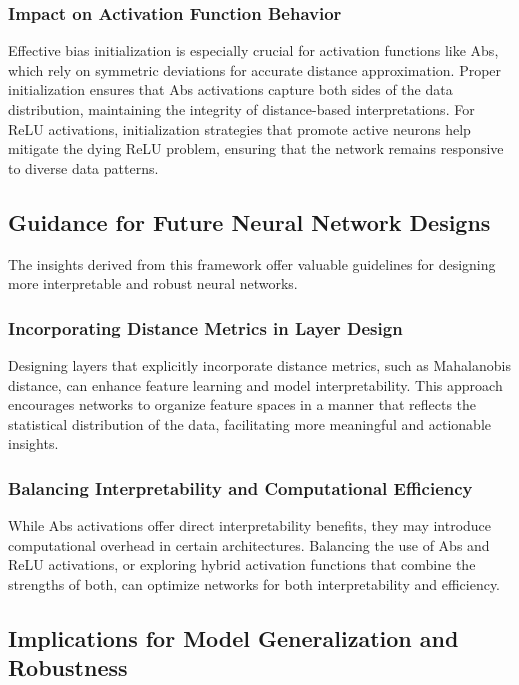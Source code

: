 \subsubsection{Impact on Activation Function Behavior}

Effective bias initialization is especially crucial for activation functions like Abs, which rely on symmetric deviations for accurate distance approximation. Proper initialization ensures that Abs activations capture both sides of the data distribution, maintaining the integrity of distance-based interpretations. For ReLU activations, initialization strategies that promote active neurons help mitigate the dying ReLU problem, ensuring that the network remains responsive to diverse data patterns.

\subsection{Guidance for Future Neural Network Designs}

The insights derived from this framework offer valuable guidelines for designing more interpretable and robust neural networks.

\subsubsection{Incorporating Distance Metrics in Layer Design}

Designing layers that explicitly incorporate distance metrics, such as Mahalanobis distance, can enhance feature learning and model interpretability. This approach encourages networks to organize feature spaces in a manner that reflects the statistical distribution of the data, facilitating more meaningful and actionable insights.

\subsubsection{Balancing Interpretability and Computational Efficiency}

While Abs activations offer direct interpretability benefits, they may introduce computational overhead in certain architectures. Balancing the use of Abs and ReLU activations, or exploring hybrid activation functions that combine the strengths of both, can optimize networks for both interpretability and efficiency.

\subsection{Implications for Model Generalization and Robustness}

